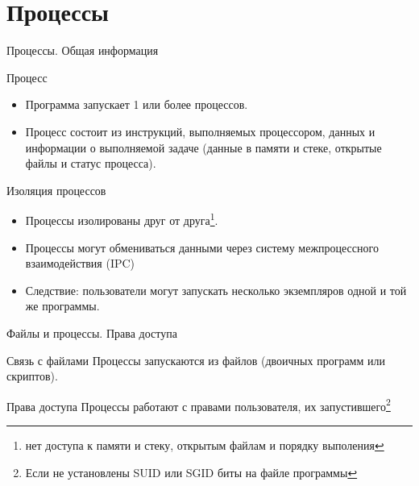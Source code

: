  \lstset{basicstyle=\tiny}



\firstframe

\section{Процессы}

\begin{frame}{Процессы. Общая информация}
  \begin{block}{Процесс}
    \begin{itemize}
      \item Программа запускает 1 или более процессов. 
      \item Процесс состоит из инструкций, выполняемых процессором, данных и информации о выполняемой задаче (данные в памяти и стеке, открытые файлы и статус процесса).
    \end{itemize} 
  \end{block} \pause

  \begin{block}{Изоляция процессов}
    \begin{itemize}
      \item Процессы изолированы друг от друга\footnote{нет доступа к памяти и стеку, открытым файлам и порядку выполения}.
      \item Процессы могут обмениваться данными через систему межпроцессного взаимодействия (IPC)
      \item Следствие: пользователи могут запускать несколько экземпляров одной и той же программы. 
    \end{itemize}
  \end{block}

\end{frame}

\begin{frame}{Файлы и процессы. Права доступа}

  \begin{block}{Связь с файлами}
    Процессы запускаются из файлов (двоичных программ или скриптов).
  \end{block}

  \begin{block}{Права доступа}
    Процессы работают с правами пользователя, их запустившего\footnote{Если не установлены SUID или SGID биты на файле программы}
  \end{block}

\end{frame}


